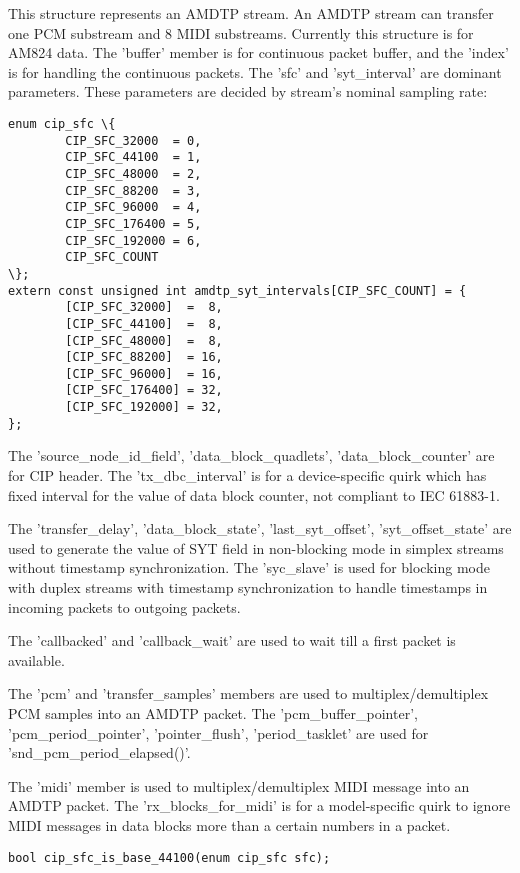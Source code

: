 \documentclass[onecolumn]{article}
\begin{document}
This structure represents an AMDTP stream. An AMDTP stream can transfer one PCM substream and 8 MIDI substreams. Currently this structure is for AM824 data. The 'buffer' member is for continuous packet buffer, and the 'index' is for handling the continuous packets. The 'sfc' and 'syt\_interval' are dominant parameters. These parameters are decided by stream's nominal sampling rate:

\begin{verbatim}
enum cip_sfc \{
        CIP_SFC_32000  = 0,
        CIP_SFC_44100  = 1,
        CIP_SFC_48000  = 2,
        CIP_SFC_88200  = 3,
        CIP_SFC_96000  = 4,
        CIP_SFC_176400 = 5,
        CIP_SFC_192000 = 6,
        CIP_SFC_COUNT
\};
extern const unsigned int amdtp_syt_intervals[CIP_SFC_COUNT] = {
        [CIP_SFC_32000]  =  8,
        [CIP_SFC_44100]  =  8,
        [CIP_SFC_48000]  =  8,
        [CIP_SFC_88200]  = 16,
        [CIP_SFC_96000]  = 16,
        [CIP_SFC_176400] = 32,
        [CIP_SFC_192000] = 32,
};
\end{verbatim}


The 'source\_node\_id\_field', 'data\_block\_quadlets', 'data\_block\_counter' are for CIP header. The 'tx\_dbc\_interval' is for a device-specific quirk which has fixed interval for the value of data block counter, not compliant to IEC 61883-1.

The 'transfer\_delay', 'data\_block\_state', 'last\_syt\_offset', 'syt\_offset\_state' are used to generate the value of SYT field in non-blocking mode in simplex streams without timestamp synchronization. The 'syc\_slave' is used for blocking mode with duplex streams with timestamp synchronization to handle timestamps in incoming packets to outgoing packets.

The 'callbacked' and 'callback\_wait' are used to wait till a first packet is available.

The 'pcm' and 'transfer\_samples' members are used to multiplex/demultiplex PCM samples into an AMDTP packet. The 'pcm\_buffer\_pointer', 'pcm\_period\_pointer', 'pointer\_flush', 'period\_tasklet' are used for 'snd\_pcm\_period\_elapsed()'.

The 'midi' member is used to multiplex/demultiplex MIDI message into an AMDTP packet. The 'rx\_blocks\_for\_midi' is for a model-specific quirk to ignore MIDI messages in data blocks more than a certain numbers in a packet.

\begin{verbatim}
bool cip_sfc_is_base_44100(enum cip_sfc sfc);
\end{verbatim}
\end{document}

